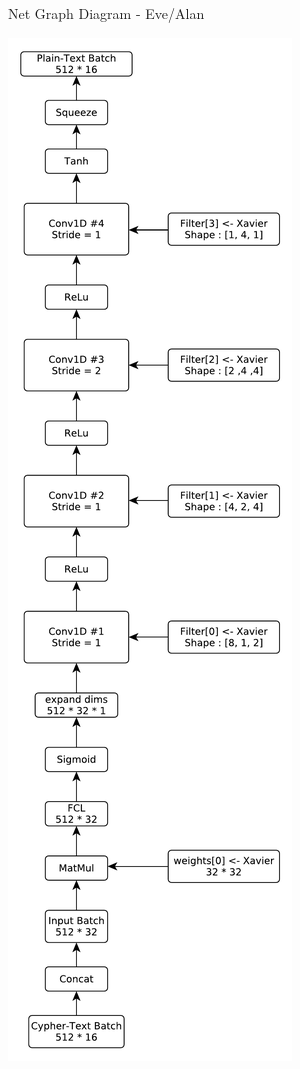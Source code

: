 \documentclass[a4paper, 12pt]{report}
\begin{document}
\newpage
\begin{blockfigure}{ Net Graph Diagram - Eve/Alan}
		\begin{center}
			\includegraphics[height=0.93\textheight]{Eve-Diagram}
		\end{center}
\end{blockfigure}
\end{document}
